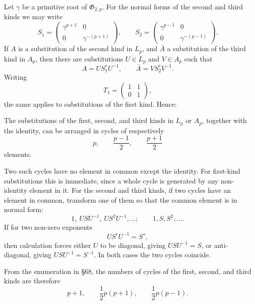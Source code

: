 \documentclass[11pt,a4paper]{book}
\begin{document}
Let \(\gamma\) be a primitive root of \(\mathfrak G_{2,p}\).  For the normal forms of the second and third kinds we may write
\begin{equation}\label{eq:69-normal}
 S_1=\begin{pmatrix}\gamma^{p+1}&0\\0&\gamma^{-(p+1)}\end{pmatrix},
 \qquad
 S_2=\begin{pmatrix}\gamma^{p-1}&0\\0&\gamma^{-(p-1)}\end{pmatrix}.
\end{equation}
If \(A\) is a substitution of the second kind in \(L_p\), and \(\bar A\) a substitution of the third kind in \(A_p\), then there are substitutions \(U\in L_p\) and \(V\in A_p\) such that
\[
 A=US_1^rU^{-1},
 \qquad
 \bar A=VS_2^rV^{-1}.
\]
Writing
\[
 T_1=\begin{pmatrix}1&1\\0&1\end{pmatrix},
\]
the same applies to substitutions of the first kind.  Hence:

The substitutions of the first, second, and third kinds in \(L_p\) or \(A_p\), together with the identity, can be arranged in cycles of respectively
\[
 p,
 \qquad \frac{p-1}{2},
 \qquad \frac{p+1}{2}
\]
elements.

Two such cycles have no element in common except the identity.  For first-kind substitutions this is immediate, since a whole cycle is generated by any non-identity element in it.  For the second and third kinds, if two cycles have an element in common, transform one of them so that the common element is in normal form:
\begin{equation}\label{eq:69-12}
 1,\ USU^{-1},\ US^2U^{-1},\ldots;
 \qquad
 1,S,S^2,\ldots.
\end{equation}
If for two non-zero exponents
\[
 US^rU^{-1}=S^s,
\]
then calculation forces either \(U\) to be diagonal, giving \(USU^{-1}=S\), or anti-diagonal, giving \(USU^{-1}=S^{-1}\).  In both cases the two cycles coincide.

From the enumeration in \S 68, the numbers of cycles of the first, second, and third kinds are therefore
\begin{equation}\label{eq:69-cycle-counts}
 p+1,
 \qquad
 \frac12p(p+1),
 \qquad
 \frac12p(p-1).
\end{equation}
\end{document}
